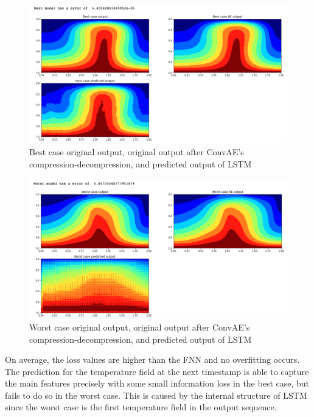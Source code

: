 \begin{figure}[H]
    \caption{Best case original output, original output after ConvAE's compression-decompression, and predicted output of LSTM}
    \includegraphics[scale=0.5]{Report LaTeX/figures/mantle_convection_images/limited_dataset/LSTM_Best.png}
\end{figure}

\begin{figure}[H]
    \caption{Worst case original output, original output after ConvAE's compression-decompression, and predicted output of LSTM}
    \includegraphics[scale=0.5]{Report LaTeX/figures/mantle_convection_images/limited_dataset/LSTM_Worst.png}
\end{figure}

On average, the loss values are higher than the FNN and no overfitting occurs. The prediction for the temperature field at the next timestamp is able to capture the main features precisely with some small information loss in the best case, but fails to do so in the worst case. This is caused by the internal structure of LSTM since the worst case is the first temperature field in the output sequence.

